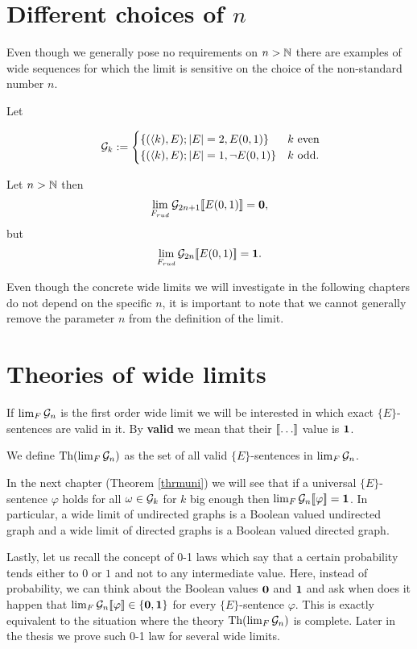 \section{Different choices of \texorpdfstring{$n$}{n}}

Even though we generally pose no requirements on $n>\mathbb{N}$ there are examples of wide sequences for which the limit is sensitive on the choice of the non-standard number $n$. 

\begin{exam}
Let 

\[\
\mathcal{G}_{k}:=
\begin{cases}
\{(\langle k),E);\left|{E}\right|=2,E(0,1)\}&\text{$k$ even}\\
\{(\langle k),E);\left|{E}\right|=1,\lnot E(0,1)\}&\text{$k$ odd.}\\
\end{cases}\]

Let $n>\mathbb{N}$ then
\begin{align}
\lim_{F_{rud}}\mathcal{G}_{2n+1} [\![ E(0,1)]\!] =\textbf{0},
\end{align}
but
\begin{align}
\lim_{F_{rud}}\mathcal{G}_{2n}[\![ E(0,1)]\!]=\textbf{1}.
\end{align}

Even though the concrete wide limits we will investigate in the following chapters do not depend on the specific $n$, it is important to note that we cannot generally remove the parameter $n$ from the definition of the limit.
\end{exam}

\section{Theories of wide limits}

If $\lim_F\mathcal{G}_n$ is the first order wide limit we will be interested in which exact $\{E\}$-sentences are valid in it. By \textbf{valid} we mean that their $\bbl\dots\bbr$ value is $\textbf{1}$.

\begin{defi}
We define $\text{Th}(\lim_F\mathcal{G}_n)$ as the set of all valid $\{E\}$-sentences in $\lim_{F}\mathcal{G}_n$.
\end{defi}

In the next chapter (Theorem \ref{thrmuni}) we will see that if a universal $\{E\}$-sentence $\varphi$ holds for all $\omega\in\mathcal{G}_k$ for $k$ big enough then $\lim_F\mathcal{G}_n[\![\varphi]\!]=\textbf{1}$. In particular, a wide limit of undirected graphs is a Boolean valued undirected graph and a wide limit of directed graphs is a Boolean valued directed graph.

Lastly, let us recall the concept of 0-1 laws which say that a certain probability tends either to $0$ or $1$ and not to any intermediate value. Here, instead of probability, we can think about the Boolean values $\textbf{0}$ and $\textbf{1}$ and ask when does it happen that $\lim_F\mathcal{G}_n[\![\varphi]\!]\in\{\textbf{0},\textbf{1}\}$ for every $\{E\}$-sentence $\varphi$. This is exactly equivalent to the situation where the theory $\text{Th}(\lim_F \mathcal{G}_n)$ is complete. Later in the thesis we prove such 0-1 law for several wide limits.
